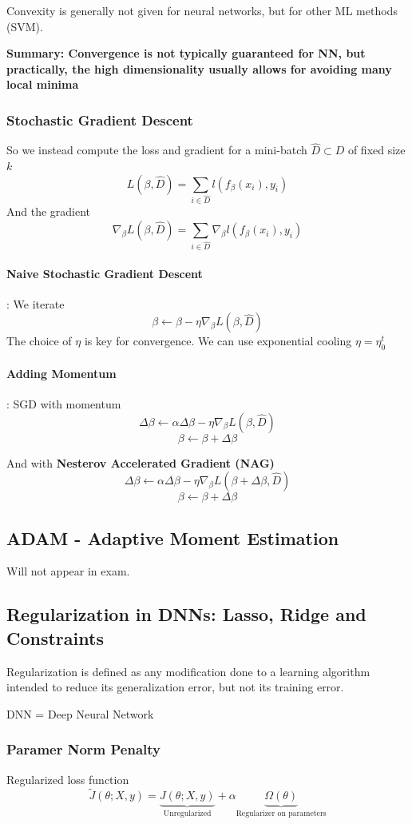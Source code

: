 \documentclass{article}
\begin{document}
Convexity is generally not given for neural networks, but for other ML methods (SVM).

\textbf{Summary: Convergence is not typically guaranteed for NN, but practically, the high dimensionality usually allows for avoiding many local minima}

\subsubsection{Stochastic Gradient Descent}
So we instead compute the loss and gradient for a mini-batch $\hat{D} \subset D$ of fixed size $k$
\[L(\beta, \hat{D}) = \sum_{i\in \hat{D}} l(f_\beta (x_i), y_i)\]
And the gradient
\[\nabla_\beta L(\beta,\hat{D}) = \sum_{i\in \hat{D}} \nabla_\beta l(f_\beta (x_i), y_i)\]
\paragraph{Naive Stochastic Gradient Descent}: We iterate
\[\beta \leftarrow \beta - \eta \nabla_\beta L(\beta,\hat{D})\]
The choice of $\eta$ is key for convergence. We can use exponential cooling $\eta = \eta_0^t$

\paragraph{Adding Momentum}: SGD with momentum
\[\Delta \beta \leftarrow \alpha \Delta \beta - \eta \nabla_\beta L(\beta,\hat{D})\]
\[\beta \leftarrow \beta + \Delta \beta\]

And with \textbf{Nesterov Accelerated Gradient (NAG)}
\[\Delta \beta \leftarrow \alpha \Delta \beta - \eta \nabla_\beta L(\beta + \Delta \beta,\hat{D})\]
\[\beta \leftarrow \beta + \Delta \beta\]

\subsection{ADAM - Adaptive Moment Estimation}
Will not appear in exam.
\subsection{Regularization in DNNs: Lasso, Ridge and Constraints}
Regularization is defined as any modification done to a learning algorithm intended to reduce its generalization error, but not its training error.

DNN = Deep Neural Network
\subsubsection{Paramer Norm Penalty}
Regularized loss function
\[\tilde{J}(\theta; X , y) = \underbrace{J(\theta; X,y)}_{\text{Unregularized}} + \alpha\underbrace{\Omega(\theta)}_{\text{Regularizer on parameters}}\]
\end{document}
